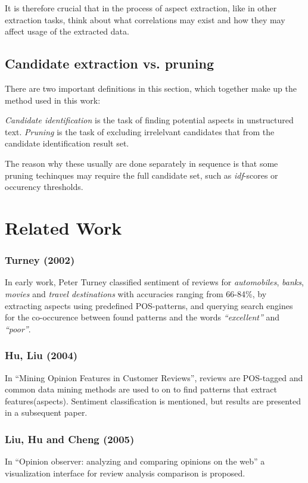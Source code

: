 \documentclass[a4paper,11pt]{kth-mag}
\begin{document}
It is therefore crucial that in the process of aspect extraction, like in other extraction tasks, think about what correlations may exist and how they may affect usage of the extracted data.

\subsection{Candidate extraction vs. pruning}
There are two important definitions in this section, which together make up the method used in this work:

\emph{Candidate identification} is the task of finding potential aspects in unstructured text. \emph{Pruning} is the task of excluding irrelelvant candidates that from the candidate identification result set.

The reason why these usually are done separately in sequence is that some pruning techinques may require the full candidate set, such as \emph{idf}-scores or occurency thresholds.


\section{Related Work}

\subsubsection{Turney (2002)}
In early work, Peter Turney classified sentiment of reviews for \emph{automobiles}, \emph{banks}, \emph{movies} and \emph{travel destinations} with accuracies ranging from 66-84\%, by extracting aspects using predefined POS-patterns, and querying search engines for the co-occurence between found patterns and the words \emph{``excellent''} and \emph{``poor''}.

\subsubsection{Hu, Liu (2004)}
In ``Mining Opinion Features in Customer Reviews'', reviews are POS-tagged and common data mining methods are used to on to find patterns that extract features(aspects). Sentiment classification is mentioned, but results are presented in a subsequent paper.

\subsubsection{Liu, Hu and Cheng (2005)}
In ``Opinion observer: analyzing and comparing opinions on the web'' a visualization interface for review analysis comparison is proposed.
\end{document}
